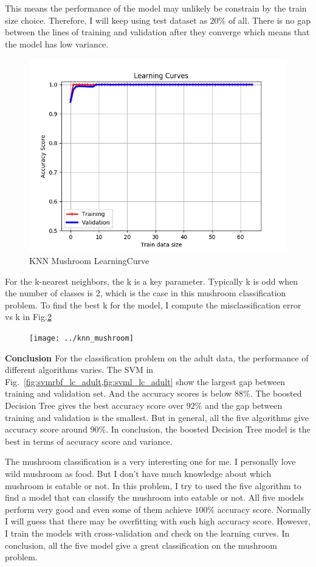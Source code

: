 \documentclass[         %
aps,                    %
prl,                    %
showpacs,               %
superscriptaddress,    %
nofootinbib,            %
twocolumn,             %
showkeys,               %
preprintnumbers,        %
floatfix               %
]{revtex4-1}               %
\begin{document}
This means the performance of the model may unlikely be constrain by the train size choice. Therefore, I will keep using test dataset as $20\%$ of all. 
There is no gap between the lines of training and validation after they converge which means that the model has low variance.
\begin{figure}[h!]
  \centering \includegraphics[width=\linewidth]{../knn_mush_LearningCurve}
  \caption{KNN Mushroom LearningCurve \label{fig:knn_lc_mush}}
\end{figure}
For the k-nearest neighbors, the k is a key parameter.
Typically k is odd when the number of classes is 2, which is the case in this mushroom classification problem. 
To find the best k for the model, I compute the misclassification error vs k in Fig.\ref{fig:knn_mush}
\begin{figure}[h!]
  \centering \texttt{[image: ../knn\_mushroom]}
  \caption{\label{fig:knn_mush}}
\end{figure}

{\bf Conclusion \label{conclusion}}
For the classification problem on the adult data, the performance of different algorithms varies. 
The SVM in Fig.~\ref{fig:svmrbf_lc_adult,fig:svml_lc_adult} show the largest gap between training and validation set. 
And the accuracy scores is below $88\%$.
The boosted Decision Tree gives the best accuracy score over $92\%$ and the gap between training and validation is the smallest.
But in general, all the five algorithms give accuracy score around $90\%$. 
In conclusion, the boosted Decision Tree model is the best in terms of accuracy score and variance.

The mushroom classification is a very interesting one for me. I personally love wild mushroom as food.
But I don't have much knowledge about which mushroom is eatable or not. 
In this problem, I try to used the five algorithm to find a model that can classify the mushroom into eatable or not. 
All five models perform very good and even some of them achieve $100\%$ accuracy score. 
Normally I will guess that there may be overfitting with such high accuracy score. 
However, I train the models with cross-validation and check on the learning curves.
In conclusion, all the five model give a great classification on the mushroom problem.


\end{document}
